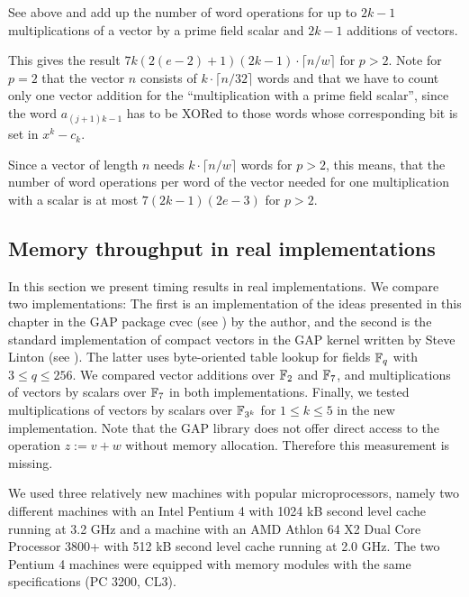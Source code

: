 \Proof See above and add up the number of word operations for up
to $2k-1$ multiplications of a vector by a prime field scalar and $2k-1$
additions of vectors. 

This gives the result $7k(2(e-2)+1)(2k-1)\cdot
\lceil n/w \rceil$ for $p > 2$. Note for $p=2$ that the vector $n$ consists of
$k \cdot \lceil n/32 \rceil$ words and that we have to count only one
vector addition for the ``multiplication with a prime field scalar'', since 
the word $a_{(j+1)k-1}$ has to be XORed to those words whose corresponding
bit is set in $x^k - c_k$.
\ProofEnd

\begin{Rem}
Since a vector of length $n$ needs $k \cdot \lceil n/w \rceil$ words
for $p > 2$, this means, that the number of word operations per word of
the vector needed for one multiplication with a scalar is at most 
$7(2k-1)(2e-3)$ for $p > 2$.
\end{Rem}

\subsection{Memory throughput in real implementations}

In this section we present timing results in real implementations. We 
compare two implementations: The first is an implementation of the
ideas presented in this chapter in the {\sf GAP} package {\sf cvec}
(see \cite{cvec}) by the author, and the second is the standard implementation
of compact vectors in the {\sf GAP} kernel written by Steve Linton
(see \cite{GAP4}).
The latter uses byte-oriented table lookup for fields $\mathbb{F}_q$ with 
$3 \le q \le 256$. We compared vector additions over $\mathbb{F}_2$ and $\mathbb{F}_7$, 
and multiplications of vectors by scalars over $\mathbb{F}_7$ in both implementations.
Finally, we tested multiplications of vectors by scalars over $\mathbb{F}_{3^k}$
for $1 \le k \le 5$ in the new implementation.
Note that the {\sf GAP} library does not offer direct access to the
operation $z := v+w$ without memory allocation. Therefore this 
measurement is missing.

We used three relatively new machines with popular microprocessors, 
namely two different machines
with an Intel Pentium 4 with 1024 kB second level cache running at 3.2 GHz 
and a machine with an AMD Athlon 64 X2 Dual Core Processor 3800+ with 512 kB
second level cache running at 2.0 GHz. The two Pentium 4 machines were
equipped with memory modules with the same specifications (PC 3200, CL3). 

